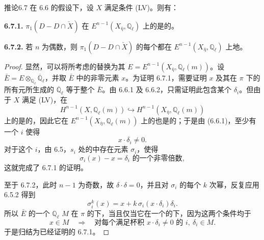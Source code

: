 \begin{SGAresult}{推论}{6.7}
在 6.6 的假设下，设 $X$ 满足条件 (LV)。则有：

\textbf{6.7.1.} $\pi_1(D-D\cap\check X)$ 在 $E^{n-1}(X_{\bar\eta},\mathbb Q_\ell)$ 上的是的。

\textbf{6.7.2.} 若 $n$ 为偶数，则 $\pi_1(D-D\cap\check X)$ 的每个都在 $E^{n-1}(X_{\bar\eta},\mathbb Q_\ell)$ 上地。
\end{SGAresult}
\begin{proof}
显然，可以将所考虑的替换为其 $E=E^{n-1}(X_{\bar\eta},\mathbb Q_\ell(m))$。设 $\bar E=E\otimes_{\mathbb Q_\ell}\overline{\mathbb Q}_\ell$，并取 $\bar E$ 中的非零元素 $x$。为证明 6.7.1，需要证明 $x$ 及其在 $\pi$ 下的所有元所生成的 $\overline{\mathbb Q}_\ell$ 等于整个 $\bar E$。由 6.6.1 及 6.6.2，只需证明此包含某个 $\delta_i$。但由于 $X$ 满足 (LV)，在
\[
H^{n-1}(X,\mathbb Q_\ell(m))\hookrightarrow H^{n-1}(X_{\bar\eta},\mathbb Q_\ell(m))
\]
上的是的，因此它在 $E^{n-1}(X_{\bar\eta},\mathbb Q_\ell(m))$ 上的也是的；于是由 (6.6.1)，至少有一个 $i$ 使得
\[
x\cdot\delta_i\neq0.
\]
对于这个 $i$，由 6.5，$s_i$ 处的中存在元素 $\sigma_i$，使得
\[
\sigma_i(x)-x=\delta_i\text{ 的一个非零倍数},
\tag{6.7.3}
\]
这就完成了 6.7.1 的证明。

至于 6.7.2，此时 $n-1$ 为奇数，故 $\delta\cdot\delta=0$，并且对 $\sigma_i$ 的每个 $k$ 次幂，反复应用 6.5.2 得到
\[
\sigma_i^k(x)=x+k\,\sigma_i(x\cdot\delta_i)\delta_i.
\tag{6.7.4}
\]
所以 $\bar E$ 的一个 $\mathbb Q_\ell$  $M$ 在 $\pi$ 的下，当且仅当它在一个的下，因为这两个条件均于
\[
x\in M\quad\Longrightarrow\quad
\text{对每个满足杯积 }x\cdot\delta_i\neq0\text{ 的 }i,\ \delta_i\in M.
\]
于是归结为已经证明的 6.7.1。
\end{proof}

